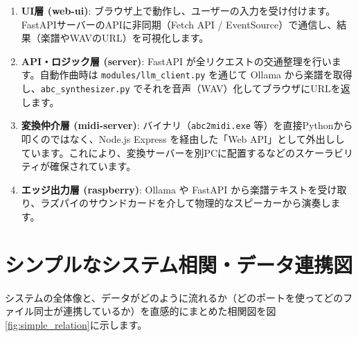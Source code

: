 \documentclass[a4paper,11pt]{jlreq}
\newcommand{\file}[1]{\texttt{\color{brand-green}#1}}
\begin{document}
\begin{enumerate}
  \item \textbf{UI層 (web-ui)}:
    ブラウザ上で動作し、ユーザーの入力を受け付けます。FastAPIサーバーのAPIに非同期（Fetch API / EventSource）で通信し、結果（楽譜やWAVのURL）を可視化します。
  \item \textbf{API・ロジック層 (server)}:
    FastAPI が全リクエストの交通整理を行います。自動作曲時は \file{modules/llm\_client.py} を通じて Ollama から楽譜を取得し、\file{abc\_synthesizer.py} でそれを音声（WAV）化してブラウザにURLを返します。
  \item \textbf{変換仲介層 (midi-server)}:
    バイナリ（\file{abc2midi.exe} 等）を直接Pythonから叩くのではなく、Node.js Express を経由した「Web API」として外出ししています。これにより、変換サーバーを別PCに配置するなどのスケーラビリティが確保されています。
  \item \textbf{エッジ出力層 (raspberry)}:
    Ollama や FastAPI から楽譜テキストを受け取り、ラズパイのサウンドカードを介して物理的なスピーカーから演奏します。
\end{enumerate}

\newpage

\section{シンプルなシステム相関・データ連携図}

システムの全体像と、データがどのように流れるか（どのポートを使ってどのファイル同士が連携しているか）を直感的にまとめた相関図を図\ref{fig:simple_relation}に示します。
\end{document}
